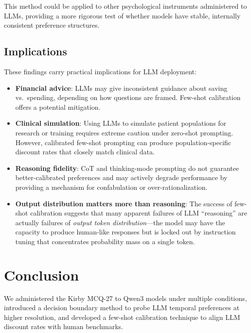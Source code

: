 \documentclass[11pt,a4paper]{article}
\begin{document}
This method could be applied to other psychological instruments administered to LLMs, providing a more rigorous test of whether models have stable, internally consistent preference structures.

\subsection{Implications}

These findings carry practical implications for LLM deployment:

\begin{itemize}
    \item \textbf{Financial advice}: LLMs may give inconsistent guidance about saving vs.\ spending, depending on how questions are framed. Few-shot calibration offers a potential mitigation.
    \item \textbf{Clinical simulation}: Using LLMs to simulate patient populations for research or training requires extreme caution under zero-shot prompting. However, calibrated few-shot prompting can produce population-specific discount rates that closely match clinical data.
    \item \textbf{Reasoning fidelity}: CoT and thinking-mode prompting do not guarantee better-calibrated preferences and may actively degrade performance by providing a mechanism for confabulation or over-rationalization.
    \item \textbf{Output distribution matters more than reasoning}: The success of few-shot calibration suggests that many apparent failures of LLM ``reasoning'' are actually failures of \emph{output token distribution}---the model may have the capacity to produce human-like responses but is locked out by instruction tuning that concentrates probability mass on a single token.
\end{itemize}

\section{Conclusion}

We administered the Kirby MCQ-27 to Qwen3 models under multiple conditions, introduced a decision boundary method to probe LLM temporal preferences at higher resolution, and developed a few-shot calibration technique to align LLM discount rates with human benchmarks.
\end{document}
